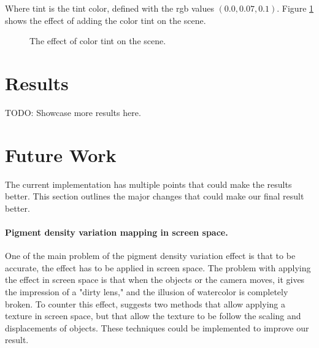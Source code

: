 \documentclass{article}
\begin{document}
\medskip \par
\noindent
Where tint is the tint color, defined with the rgb values $(0.0, 0.07, 0.1)$.
Figure \ref{fig:scene_with_tint} shows the effect of adding the color tint on the scene.

\begin{figure}[h]
	\centering
	\hspace{0.5em}
	\caption{The effect of color tint on the scene.}
	\label{fig:scene_with_tint}
\end{figure}


\section{Results}

TODO: Showcase more results here.

\newpage
\section{Future Work}
\label{sec:future_work}
The current implementation has multiple points that could make the results better. This section outlines the major changes that could make our final result better.

\paragraph{Pigment density variation mapping in screen space.} One of the main problem of the pigment density variation effect is that to be accurate, the effect has to be applied in screen space. The problem with applying the effect in screen space is that when the objects or the camera moves, it gives the impression of a "dirty lens," and the illusion of watercolor is completely broken. To counter this effect, \cite{watercolor_paper} suggests two methods that allow applying a texture in screen space, but that allow the texture to be follow the scaling and displacements of objects. These techniques could be implemented to improve our result.
\end{document}
